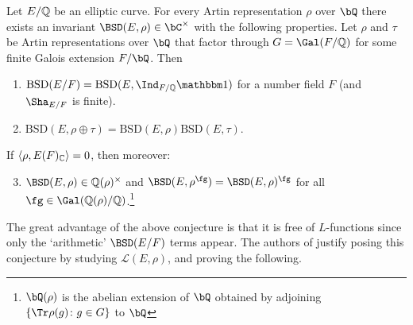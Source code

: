 \begin{conj}{\cite[Conjecture 4]{DEW1}}\label{conj_4}
    Let $E/\mathbb{Q}$ be an elliptic curve. 
    For every Artin representation $\rho$ over $\bQ$ there exists an invariant $\BSD(E, \rho) \in \bC^{\times}$ with the following properties. 
    Let $\rho$ and $\tau$ be Artin representations over $\bQ$ that factor through $G = \Gal(F/\QQ)$ for some finite Galois extension $F / \bQ$. Then 
    \begin{enumerate}[label={\bfseries C\arabic*.}]
        \setlength\itemsep{0em}
        \item $\mathrm{BSD}(E/F)=\mathrm{BSD}(E,\Ind_{F/\QQ}\trivial)$ for a number field $F$ (and $\Sha_{E/F}$ is finite).
        \item $\mathrm{BSD}(E,\rho\oplus\tau)=\mathrm{BSD}(E,\rho)\mathrm{BSD}(E,\tau)$.
    \end{enumerate}       
        If $\langle\rho,E(F)_{\mathbb{C}}\rangle=0$, then moreover:
    \begin{enumerate}[label={\bfseries C\arabic*.}]
        \setcounter{enumi}{2}
       \item $\BSD(E,\rho)\in\QQ(\rho)^{\times}$ and $\BSD(E,\rho^{\fg})=\BSD(E,\rho)^{\fg}$ for all $\fg\in\Gal(\QQ(\rho)/\QQ)$.\footnote{$\bQ(\rho)$ is the abelian extension of $\bQ$ obtained by adjoining $\{\Tr \rho (g) \colon g \in G \}$ to $\bQ$}
    \end{enumerate}
\end{conj}

The great advantage of the above conjecture is that it is free of $L$-functions since only the `arithmetic' $\BSD(E/F)$ terms appear. The authors of \cite{DEW1} justify posing this conjecture by studying $\mathcal{L}(E, \rho)$, and proving the following.

